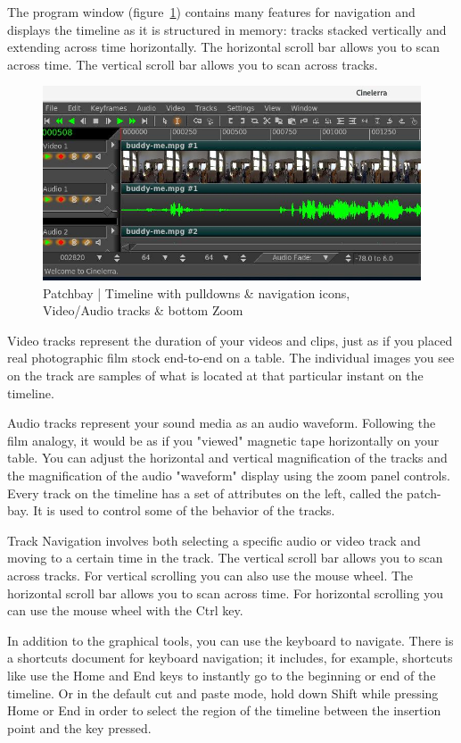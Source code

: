 The program window (figure~\ref{fig:pathbay})   contains many features for navigation and displays the timeline as it is structured in memory: tracks stacked vertically and extending across time horizontally. 
The horizontal scroll bar allows you to scan across time. 
The vertical scroll bar allows you to scan across tracks.

\begin{figure}[htpb]
    \centering
    \includegraphics[width=0.8\linewidth]{images/pathbay.png}
    \caption{Patchbay  | Timeline with pulldowns \& navigation icons, Video/Audio tracks \& bottom Zoom}
    \label{fig:pathbay}
\end{figure}


Video tracks represent the duration of your videos and clips, just as if you placed real photographic film stock end-to-end on a table. 
The individual images you see on the track are samples of what is located at that particular instant on the timeline.

Audio tracks represent your sound media as an audio waveform. 
Following the film analogy, it would be as if you "viewed" magnetic tape horizontally on your table. 
You can adjust the horizontal and vertical magnification of the tracks and the magnification of the audio "waveform" display using the zoom panel controls. 
Every track on the timeline has a set of attributes on the left, called the patch-bay. 
It is used to control some of the behavior of the tracks.

Track Navigation involves both selecting a specific audio or video track and moving to a certain time in the track. 
The vertical scroll bar allows you to scan across tracks. 
For vertical scrolling you can also use the mouse wheel. 
The horizontal scroll bar allows you to scan across time. For horizontal scrolling you can use the mouse wheel with the Ctrl key.  

In addition to the graphical tools, you can use the keyboard to navigate.  
There is a shortcuts document for keyboard navigation; it includes, for example, shortcuts like use the Home and End keys to instantly go to the beginning or end of the timeline.  
Or in the default cut and paste mode, hold down Shift while pressing Home or End in order to select the region of the timeline between the insertion point and the key pressed.

